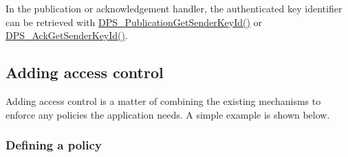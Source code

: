 In the publication or acknowledgement handler, the authenticated key identifier can be retrieved with \hyperlink{group__publication_ga1d7e81c2f0b19736a4f7a7195e5bd98d}{D\+P\+S\+\_\+\+Publication\+Get\+Sender\+Key\+Id()} or \hyperlink{group__publication_ga9190b8fa3bad848fb428acd6c0c2b210}{D\+P\+S\+\_\+\+Ack\+Get\+Sender\+Key\+Id()}.\hypertarget{tutorials-security_adding-access-control}{}\subsection{Adding access control}\label{tutorials-security_adding-access-control}
Adding access control is a matter of combining the existing mechanisms to enforce any policies the application needs. A simple example is shown below.\hypertarget{tutorials-security_defining-a-policy}{}\subsubsection{Defining a policy}\label{tutorials-security_defining-a-policy}

